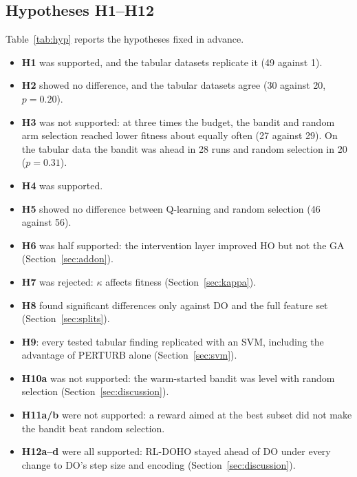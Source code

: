 \documentclass[journal]{IEEEtran}
\begin{document}
\subsection{Hypotheses H1--H12}
Table~\ref{tab:hyp} reports the hypotheses fixed in advance.
\begin{itemize}
\item \textbf{H1} was supported, and the tabular datasets replicate it (49 against 1).
\item \textbf{H2} showed no difference, and the tabular datasets agree (30 against 20, $p=0.20$).
\item \textbf{H3} was not supported: at three times the budget, the bandit and random arm selection reached lower fitness about equally often (27 against 29). On the tabular data the bandit was ahead in 28 runs and random selection in 20 ($p=0.31$).
\item \textbf{H4} was supported.
\item \textbf{H5} showed no difference between Q-learning and random selection (46 against 56).
\item \textbf{H6} was half supported: the intervention layer improved HO but not the GA (Section~\ref{sec:addon}).
\item \textbf{H7} was rejected: $\kappa$ affects fitness (Section~\ref{sec:kappa}).
\item \textbf{H8} found significant differences only against DO and the full feature set (Section~\ref{sec:splits}).
\item \textbf{H9}: every tested tabular finding replicated with an SVM, including the advantage of PERTURB alone (Section~\ref{sec:svm}).
\item \textbf{H10a} was not supported: the warm-started bandit was level with random selection (Section~\ref{sec:discussion}).
\item \textbf{H11a/b} were not supported: a reward aimed at the best subset did not make the bandit beat random selection.
\item \textbf{H12a--d} were all supported: RL-DOHO stayed ahead of DO under every change to DO's step size and encoding (Section~\ref{sec:discussion}).
\end{itemize}
\end{document}
